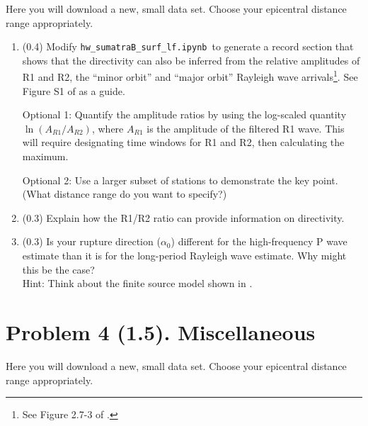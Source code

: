 \documentclass[11pt,titlepage,fleqn]{article}
\newcommand{\tfilelf}{{\tt hw\_sumatraB\_surf\_lf.ipynb}}
\begin{document}
Here you will download a new, small data set.
Choose your epicentral distance range appropriately.

\begin{enumerate}
\item (0.4) Modify \tfilelf\ to generate a record section that shows that the directivity can also be inferred from the relative amplitudes of R1 and R2, the ``minor orbit'' and ``major orbit'' Rayleigh wave arrivals\footnote{See Figure 2.7-3 of \citet{SteinWysession}.}. See Figure S1 of \citet{Ammon2005} as a guide.

Optional 1: Quantify the amplitude ratios by using the log-scaled quantity $\ln(A_{R1}/A_{R2})$, where $A_{R1}$ is the amplitude of the filtered R1 wave. This will require designating time windows for R1 and R2, then calculating the maximum.

Optional 2: Use a larger subset of stations to demonstrate the key point. (What distance range do you want to specify?)

\item (0.3) Explain how the R1/R2 ratio can provide information on directivity.

\item (0.3) Is your rupture direction ($\alpha_0$) different for the high-frequency P wave estimate than it is for the long-period Rayleigh wave estimate. Why might this be the case? \\
Hint: Think about the finite source model shown in .
\end{enumerate}


\section*{Problem 4 (1.5). Miscellaneous}

Here you will download a new, small data set.
Choose your epicentral distance range appropriately.
\end{document}
